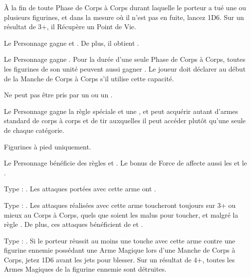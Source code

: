 \begin{multicols}{2}
À la fin de toute Phase de Corps à Corps durant laquelle le porteur a tué une ou plusieurs figurines, et dans la mesure où il n'est pas en fuite, lancez 1D6. Sur un résultat de 3+, il Récupère un Point de Vie.

Le Personnage gagne  et \stupidity{}. De plus, il obtient .

Le Personnage gagne \poisonedattacks{}. Pour la durée d'une seule Phase de Corps à Corps, toutes les figurines de son unité peuvent aussi gagner \poisonedattacks{}. Le joueur doit déclarer au début de la Manche de Corps à Corps s'il utilise cette capacité.

Ne peut pas être pris par un \wizard{} ou un \mammothhunter{}.

Le Personnage gagne la règle spéciale \weaponmaster{} et une \platearmour{}, et peut acquérir autant d'armes standard de corps à corps et de tir auxquelles il peut accéder plutôt qu'une seule de chaque catégorie.

Figurines à pied uniquement.

Le Personnage bénéficie des règles \devastatingcharge{} et \thunderouscharge{}. Le bonus de Force de \thunderouscharge{} affecte aussi les \impacthits{} et le \stomp{}.

\endpricelistNSP
\end{multicols}

\closearmynewsection

\startarmymagicalitems

\armymagicalweapons

\startpricelist

Type : \gw{}. Les attaques portées avec cette arme ont .

Type : \ironfist{}. Les attaques réalisées avec cette arme toucheront toujours sur 3+ ou mieux au Corps à Corps, quels que soient les malus pour toucher, et malgré la règle \parry{}. De plus, ces attaques bénéficient de  et .

Type : \ironfist{}. Si le porteur réussit au moins une touche avec cette arme contre une figurine ennemie possédant une Arme Magique lors d'une Manche de Corps à Corps, jetez 1D6 avant les jets pour blesser. Sur un résultat de 4+, toutes les Armes Magiques de la figurine ennemie sont détruites.

